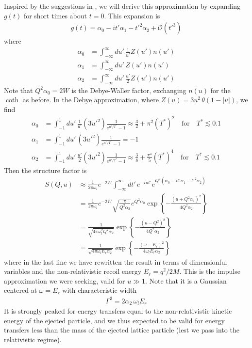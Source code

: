 \documentclass{article}
\newcommand{\OO}{\mathcal{O}}
\begin{document}
Inspired by the suggestions in \cite{impulse}, we will derive this approximation by expanding $g(t)$ for short times about $t = 0$. This expansion is
\begin{align}
g(t) = \alpha_0 - it'\alpha_1 - t'^2 \alpha_2 + \OO(t'^3)
\end{align}
where
\begin{align}
\alpha_0 &= \int_{-\infty}^\infty du'\,\frac{1}{u'} Z(u')n(u') \\
\alpha_1 &= \int_{-\infty}^\infty du'\,Z(u')n(u') \\
\alpha_2 &=  \int_{-\infty}^\infty du'\,\frac{u'}{2} Z(u')n(u')
\end{align}
Note that $Q^2\alpha_0 = 2 W$ is the Debye-Waller factor, exchanging $n(u)$ for the $\coth$ as before. In the Debye approximation, where $Z(u) = 3 u^2\, \theta(1-|u|)$, we find
\begin{align}
\alpha_0 &= \int_{-1}^1 du'\, \frac{1}{u'} (3 u'^2) \frac{1}{e^{u'/T^*}-1} \approx \frac32 + \pi^2 (T^*)^2  \quad \text{for} \quad T^*\lesssim 0.1 \label{eq:alpha-0}\\
\alpha_1 &= \int_{-1}^1 du'\, (3 u'^2) \frac{1}{e^{u'/T^*}-1} = -1 \label{eq:alpha-1}\\
\alpha_2 &= \int_{-1}^1 du'\,\frac{u'}{2} (3 u'^2) \frac{1}{e^{u'/T^*}-1} \approx \frac{3}{8} + \frac{\pi^4}{5}(T^*)^4 \quad \text{for} \quad T^*\lesssim 0.1
  \label{eq:alpha-2}
\end{align}
Then the structure factor is
\begin{align}
S(Q, u) &\approx\frac{1}{2 \pi \omega_l} e^{-2 W} \int_{-\infty}^\infty dt'\, e^{-iut'} e^{Q^2 (\alpha_0 - it'\alpha_1 - t'^2 \alpha_2)} \nonumber\\
   &= \frac{1}{2 \pi \omega_l} e^{-2 W} \sqrt{\frac{\pi}{Q^2 \alpha_2}} e^{Q^2 \alpha_0} \exp\left\{ -\frac{(u + Q^2 \alpha_1)^2}{4 Q^2 \alpha_2} \right\} \nonumber\\
   &= \frac{1}{\sqrt{4 \pi \omega_l^2 Q^2 \alpha_2}} \exp\left\{ -\frac{(u - Q^2)^2}{4 Q^2 \alpha_2} \right\} \\
   &= \frac{1}{\sqrt{4 \pi \omega_l E_r \alpha_2}} \exp\left\{ -\frac{(\omega - E_r)^2}{4 \omega_lE_r \alpha_2} \right\}
   \label{eq:ImpulseApproximationStructureFactor}
\end{align}
where in the last line we have rewritten the result in terms of dimensionful variables and the non-relativistic recoil energy $E_r = q^2 / 2 M$. This is the impulse approximation we were seeking, valid for $u \gg 1$. Note that it is a Gaussian centered at $\omega = E_r$ with characteristic width
\begin{align}
\Gamma^2 = 2 \alpha_2\, \omega_l E_r
\end{align}
 It is strongly peaked for energy transfers equal to the non-relativistic kinetic energy of the ejected particle, and we thus expected to be valid for energy transfers less than the mass of the ejected lattice particle (lest we pass into the relativistic regime).
\end{document}
